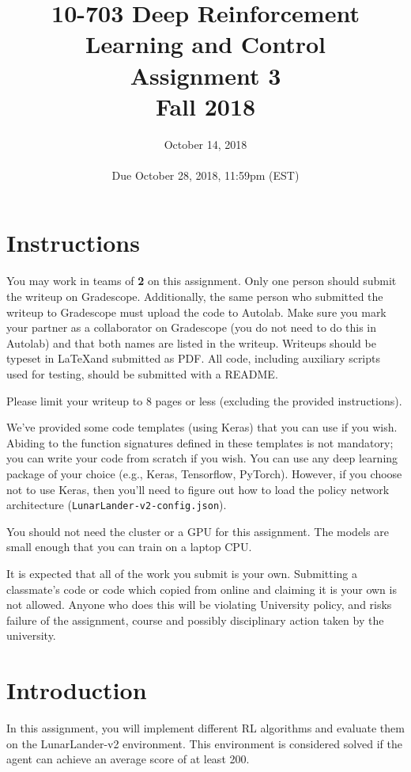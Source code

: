 \documentclass[12pt]{article}
\title{10-703 Deep Reinforcement Learning and Control\\
  Assignment 3\\
  Fall 2018
}
\date{October 14, 2018\\
  \hspace{1cm}\\
Due October 28, 2018, 11:59pm (EST)}
\begin{document}
\maketitle

\section*{Instructions}

You may work in teams of \textbf{2} on this assignment. Only one person should submit the writeup on Gradescope. Additionally, the same person who submitted the writeup to Gradescope must upload the code to Autolab.  Make sure you mark your partner as a collaborator on Gradescope (you do not need to do this in Autolab) and that both names are listed in the writeup.  Writeups should be typeset in \LaTeX and submitted as PDF. All code, including auxiliary scripts used for testing, should be submitted with a README.

Please limit your writeup to 8 pages or less (excluding the provided instructions).

We've provided some code templates (using Keras) that you can use if you wish. Abiding to the function signatures defined in these templates is not mandatory; you can write your code from scratch if you wish. You can use any deep learning package of your choice (e.g., Keras, Tensorflow, PyTorch). However, if you choose not to use Keras, then you'll need to figure out how to load the policy network architecture (\texttt{LunarLander-v2-config.json}).

You should not need the cluster or a GPU for this assignment. The models are small enough that you can train on a laptop CPU.

It is expected that all of the work you submit is your own. Submitting a classmate's code or code which copied from online and claiming it is your own is not allowed. Anyone who does this will be violating University policy, and risks failure of the assignment, course and possibly disciplinary action taken by the university.

\section*{Introduction}

In this assignment, you will implement different RL algorithms and evaluate them on the LunarLander-v2 environment. This environment is considered solved if the agent can achieve an average score of at least 200.
\end{document}

